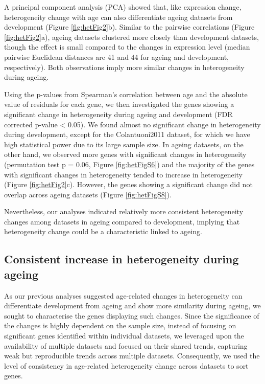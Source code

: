 \documentclass[12pt,twoside]{unicam}
\begin{document}
A principal component analysis (PCA) showed that, like expression change, heterogeneity change with age can also differentiate ageing datasets from development (Figure \ref{fig:hetFig2}b). Similar to the pairwise correlations (Figure \ref{fig:hetFig2}a), ageing datasets clustered more closely than development datasets, though the effect is small compared to the changes in expression level (median pairwise Euclidean distances are 41 and 44 for ageing and development, respectively). Both observations imply more similar changes in heterogeneity during ageing.

Using the p-values from Spearman's correlation between age and the absolute value of residuals for each gene, we then investigated the genes showing a significant change in heterogeneity during ageing and development (FDR corrected p-value \textless{} 0.05). We found almost no significant change in heterogeneity during development, except for the Colantuoni2011 dataset, for which we have high statistical power due to its large sample size. In ageing datasets, on the other hand, we observed more genes with significant changes in heterogeneity (permutation test p = 0.06, Figure \ref{fig:hetFigS6}) and the majority of the genes with significant changes in heterogeneity tended to increase in heterogeneity (Figure \ref{fig:hetFig2}c). However, the genes showing a significant change did not overlap across ageing datasets (Figure \ref{fig:hetFigS8}).

Nevertheless, our analyses indicated relatively more consistent heterogeneity changes among datasets in ageing compared to development, implying that heterogeneity change could be a characteristic linked to ageing.

\hypertarget{consistent-increase-in-heterogeneity-during-ageing}{%
\subsection{Consistent increase in heterogeneity during ageing}\label{consistent-increase-in-heterogeneity-during-ageing}}

As our previous analyses suggested age-related changes in heterogeneity can differentiate development from ageing and show more similarity during ageing, we sought to characterise the genes displaying such changes. Since the significance of the changes is highly dependent on the sample size, instead of focusing on significant genes identified within individual datasets, we leveraged upon the availability of multiple datasets and focused on their shared trends, capturing weak but reproducible trends across multiple datasets. Consequently, we used the level of consistency in age-related heterogeneity change across datasets to sort genes.
\end{document}
